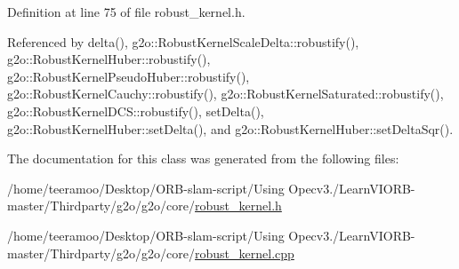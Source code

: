 Definition at line 75 of file robust\+\_\+kernel.\+h.



Referenced by delta(), g2o\+::\+Robust\+Kernel\+Scale\+Delta\+::robustify(), g2o\+::\+Robust\+Kernel\+Huber\+::robustify(), g2o\+::\+Robust\+Kernel\+Pseudo\+Huber\+::robustify(), g2o\+::\+Robust\+Kernel\+Cauchy\+::robustify(), g2o\+::\+Robust\+Kernel\+Saturated\+::robustify(), g2o\+::\+Robust\+Kernel\+D\+C\+S\+::robustify(), set\+Delta(), g2o\+::\+Robust\+Kernel\+Huber\+::set\+Delta(), and g2o\+::\+Robust\+Kernel\+Huber\+::set\+Delta\+Sqr().



The documentation for this class was generated from the following files\+:\begin{DoxyCompactItemize}
\item 
/home/teeramoo/\+Desktop/\+O\+R\+B-\/slam-\/script/\+Using Opecv3./\+Learn\+V\+I\+O\+R\+B-\/master/\+Thirdparty/g2o/g2o/core/\hyperlink{robust__kernel_8h}{robust\+\_\+kernel.\+h}\item 
/home/teeramoo/\+Desktop/\+O\+R\+B-\/slam-\/script/\+Using Opecv3./\+Learn\+V\+I\+O\+R\+B-\/master/\+Thirdparty/g2o/g2o/core/\hyperlink{robust__kernel_8cpp}{robust\+\_\+kernel.\+cpp}\end{DoxyCompactItemize}
